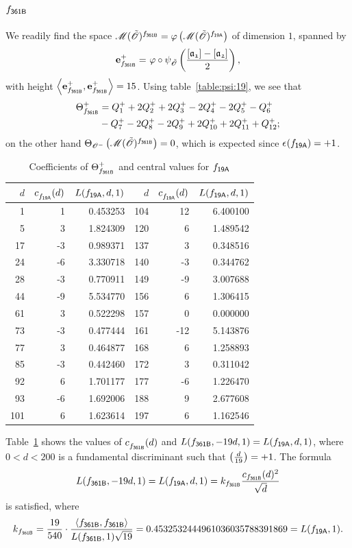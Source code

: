\subsection{$f_\mathsf{{361B}}$}
We readily find the space $\operatorname{{\mathscr M}}({\tilde{{\mathscr{O}}}})^{f_\mathsf{{361B}}}
={\varphi}\left(\operatorname{{\mathscr M}}({\tilde{{\mathscr{O}}}})^{f_\mathsf{{19A}}}\right)$
of dimension $1$, spanned by
\begin{align*}
  \e{\mf{361B}}^+ = &\ \twist\circ\psi_{\Ot}\left(\frac{\cls{a_{1}}-\cls{a_{2}}}{2}\right),\\
\end{align*}
with height $\<\e{\mf{361B}}^+,\e{\mf{361B}}^+>=15$.
Using table~\ref{table:psi:19},
we see that
\begin{align*}
  {\Theta}^+_{f_\mathsf{{361B}}} & =  Q_{1}^{+} + 2Q_{2}^{+} + 2Q_{3}^{+} - 2Q_{4}^{+} - 2Q_{5}^{+} - Q_{6}^{+} \\ & - Q_{7}^{+} - 2Q_{8}^{+} - 2Q_{9}^{+} + 2Q_{10}^{+} + 2Q_{11}^{+} + Q_{12}^{+}; \\
\end{align*}
on the other hand
${\Theta}_{{{\mathscr{O}}^-}}\left(\operatorname{{\mathscr M}}({\tilde{{\mathscr{O}}}})^{f_\mathsf{{361B}}}\right)  = 0$,
which is expected since $\sign(\mf{19A})= +1$.
\begin{table}
\begin{tabular}{||r|rr||r|rr||}
\hline
$d$ & $c^{}_{f_\mathsf{{19A}}}(d)$ & $L(f_\mathsf{{19A}},d,1)$& $d$ & $c^{}_{f_\mathsf{{19A}}}(d)$ & $L(f_\mathsf{{19A}},d,1)$\\
\hline
   1 & 1 & 0.453253 & 104 & 12 & 6.400100 \\
   5 & 3 & 1.824309 & 120 & 6 & 1.489542 \\
   17 & -3 & 0.989371 & 137 & 3 & 0.348516 \\
   24 & -6 & 3.330718 & 140 & -3 & 0.344762 \\
   28 & -3 & 0.770911 & 149 & -9 & 3.007688 \\
   44 & -9 & 5.534770 & 156 & 6 & 1.306415 \\
   61 & 3 & 0.522298 & 157 & 0 & 0.000000 \\
   73 & -3 & 0.477444 & 161 & -12 & 5.143876 \\
   77 & 3 & 0.464877 & 168 & 6 & 1.258893 \\
   85 & -3 & 0.442460 & 172 & 3 & 0.311042 \\
   92 & 6 & 1.701177 & 177 & -6 & 1.226470 \\
   93 & -6 & 1.692006 & 188 & 9 & 2.677608 \\
   101 & 6 & 1.623614 & 197 & 6 & 1.162546 \\
\hline
\end{tabular}
\caption{Coefficients of ${\Theta}^+_{f_\mathsf{{361B}}}$ and central values for $f_\mathsf{{19A}}$
          \label{table:dlcs:361B+}}
\end{table}
Table~\ref{table:dlcs:361B+} shows
the values of $c^{}_{f_\mathsf{{361B}}}(d)$
and $L(f_\mathsf{{361B}},-19d,1) = L(f_\mathsf{{19A}},d,1)$,
where $0<d<200$ is a fundamental discriminant
such that
$\kro{d}{19}=+1$.
The formula
\[
  L(f_\mathsf{{361B}},-19d,1) = L(f_\mathsf{{19A}},d,1)
  = k_{f_\mathsf{{361B}}} \frac{c_{f_\mathsf{{361B}}}(d)^2}{\sqrt{d}}
\]
is satisfied, where 
\[
  k_{\mf{361B}} = \frac{19}{540}\cdot
  \frac{\<\mf{361B},\mf{361B}>}
        {L(\mf{361B},1)\sqrt{19}}
  = 0.4532532444961036035788391869  = L(\mf{19A},1).
\]
